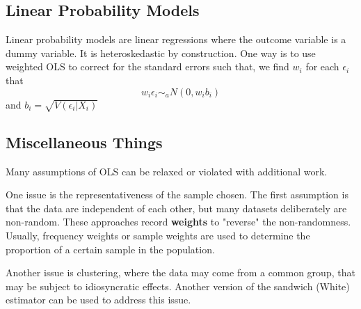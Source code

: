 \subsection{Linear Probability Models}
Linear probability models are linear regressions where the outcome variable is a dummy variable. It is heteroskedastic by construction. One way is to use weighted OLS to correct for the standard errors such that, we find $w_i$ for each $\epsilon_i$ that
$$w_i\epsilon_i \sim_a N(0, w_ib_i)$$
and $b_i = \sqrt{V(\epsilon_i | X_i)}$

\subsection{Miscellaneous Things}
Many assumptions of OLS can be relaxed or violated with additional work.

One issue is the representativeness of the sample chosen. The first assumption is that the data are independent of each other, but many datasets deliberately are non-random. These approaches record \textbf{weights} to "reverse" the non-randomness. Usually, frequency weights or sample weights are used to determine the proportion of a certain sample in the population.

Another issue is clustering, where the data may come from a common group, that may be subject to idiosyncratic effects. Another version of the sandwich (White) estimator can be used to address this issue.

\newpage
